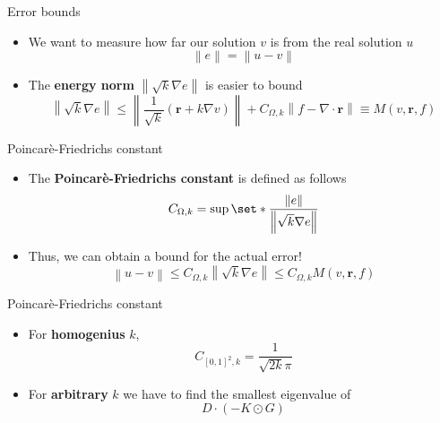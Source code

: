 \documentclass{beamer}
\newcommand{\norm}[1]{\left\lVert#1\right\rVert}
\DeclarePairedDelimiter\set\{\}
\begin{document}
    \begin{frame}{Error bounds}
        \begin{itemize}
            \item We want to measure how far our solution $v$ is from the real solution $u$
            \begin{equation*}
                \norm{e} = \norm{u - v}
            \end{equation*}
            \item The \textbf{energy norm} $\norm{\sqrt{k}\nabla e}$ is easier to bound
            \begin{equation*}
                \norm{\sqrt{k}\nabla e} \leq \norm{\frac{1}{\sqrt{k}} (\bm{r} + k\nabla v)} + C_{\Omega, k} \norm{f - \nabla \cdot \bm{r}} \equiv M(v, \bm{r}, f)
            \end{equation*}
        \end{itemize}
    \end{frame}

    \begin{frame}{Poincarè-Friedrichs constant}
        \begin{itemize}
            \item The \textbf{Poincarè-Friedrichs constant} is defined as follows
            \begin{equation*}
                C_{\Omega, k} = \sup\set*{\frac{\norm{e}}{\norm{\sqrt{k}\nabla e}}}
            \end{equation*}
            \item Thus, we can obtain a bound for the actual error!
            \begin{equation*}
                \norm{u - v} \leq C_{\Omega, k} \norm{\sqrt{k}\nabla e} \leq C_{\Omega, k}M(v, \bm{r}, f)
            \end{equation*}
        \end{itemize}
    \end{frame}

    \begin{frame}{Poincarè-Friedrichs constant}
        \begin{itemize}
            \item For \textbf{homogenius} $k$,
            \begin{equation*}
                C_{[0, 1]^2, k} = \frac{1}{\sqrt{2 k} \pi}    
            \end{equation*}
            \item For \textbf{arbitrary} $k$ we have to find the smallest eigenvalue of
            \begin{equation*}
                D \cdot (-K \odot G) 
            \end{equation*}
        \end{itemize}
    \end{frame}
\end{document}
